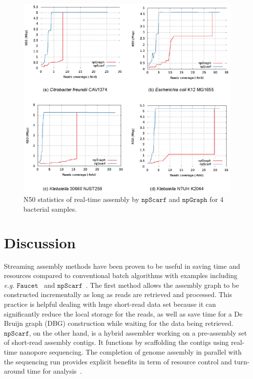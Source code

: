 \documentclass[10pt,letterpaper]{article}
\newcommand{\npscarf}{$\mathtt{npScarf}$}
\newcommand{\npgraph}{$\mathtt{npGraph}$}
\newcommand{\EG}{\emph{e.g.}}
\begin{document}
\begin{figure}[!hbt]
\centering
\includegraphics[width=\textwidth]{images/Fig3.eps}
\caption{N50 statistics of real-time assembly by \npscarf{} and \npgraph{} for 4 bacterial samples.}
\label{F:npgraph_rt}
\end{figure}

\section*{Discussion}

Streaming assembly methods have been proven to be useful in saving time and resources compared to conventional batch algorithms with examples including \EG{} $\mathtt{Faucet}$~\cite{Rozov2017faucet} and \npscarf{}~\cite{Cao2017scaffolding}. The first method allows the assembly graph to be constructed incrementally as long as reads are retrieved and processed. This practice is helpful dealing with huge short-read data set because it can significantly reduce the local storage for the reads, as well as save time for a De Bruijn graph (DBG) construction while waiting for the data being retrieved.
\npscarf{}, on the other hand, 
is a hybrid assembler working on a pre-assembly set of short-read assembly contigs. It functions by scaffolding the contigs using real-time nanopore sequencing. The completion of genome assembly in parallel with the sequencing run provides explicit benefits in term of resource control and turn-around time for analysis~\cite{Cao2017scaffolding}.  
\end{document}
